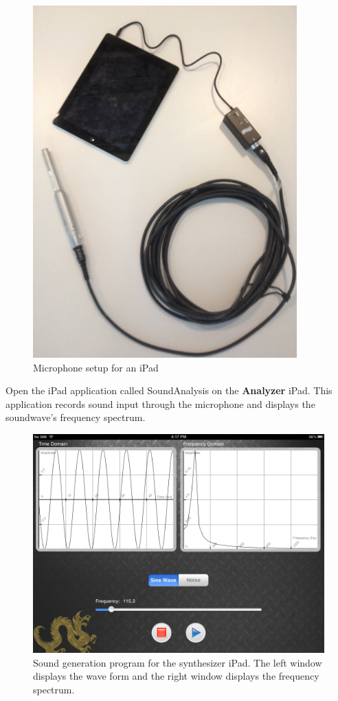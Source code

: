 \documentclass[12pt]{article}
\begin{document}
\begin{figure}[!h]
\centering
\includegraphics[width=4in]{images/gettingstarted/iRigSetup}
\caption{Microphone setup for an iPad}
\label{micSetup}
\end{figure}

Open the iPad application called SoundAnalysis on the \textbf{Analyzer} iPad. This application records sound input through the microphone and displays the soundwave's frequency spectrum.

\begin{figure}[!h]
\centering
\includegraphics[width=6in]{images/Screenshots/SoundCannonApp.PNG}
\caption{Sound generation program for the synthesizer iPad. The left window displays the wave form and the right window displays the frequency spectrum.}
\label{synthesizerProgram}
\end{figure}
\end{document}
